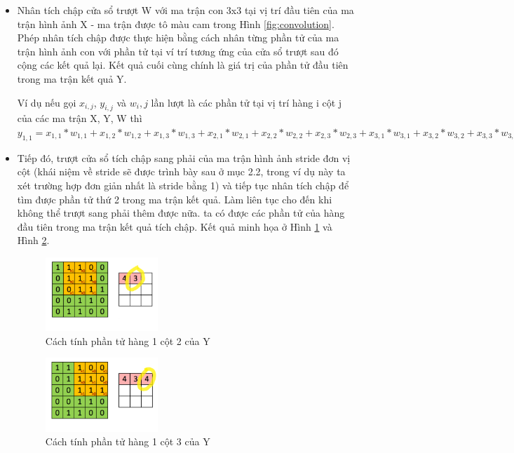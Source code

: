 \documentclass[a4paper]{article}
\begin{document}
\begin{itemize}
    \item Nhân tích chập cửa sổ trượt W với ma trận con 3x3 tại vị trí đầu tiên của ma
trận hình ảnh X - ma trận được tô màu cam trong Hình \ref{fig:convolution}. Phép nhân tích chập được thực hiện bằng cách nhân từng phần
tử của ma trận hình ảnh con với phần tử tại ví trí tương ứng của cửa sổ trượt
sau đó cộng các kết quả lại. Kết quả cuối cùng chính là giá trị của phần tử
đầu tiên trong ma trận kết quả Y. 

Ví dụ nếu gọi $x_{i,j}$, $y_{i,j}$ và $w_i,j$ lần lượt là các phần tử tại vị trí hàng i cột j của các ma trận X, Y, W thì $y_{1,1} = x_{1,1}*w_{1,1}+x_{1,2}*w_{1,2}+x_{1,3}*w_{1,3}+x_{2,1}*w_{2,1}+x_{2,2}*w_{2,2}+x_{2,3}*w_{2,3}+x_{3,1}*w_{3,1}+x_{3,2}*w_{3,2}+x_{3,3}*w_{3,3} = 1 * 1 + 1 * 0 + 1 * 1 + 0 * 0 + 1 * 1 + 1 * 0 + 0 * 1 + 0 * 0 + 1 * 1 = 4$

\item Tiếp đó, trượt cửa sổ tích chập sang phải của ma trận hình ảnh stride đơn vị cột (khái niệm về stride sẽ được trình bày sau ở mục 2.2, trong ví dụ này ta xét trường hợp đơn giản nhất là stride bằng 1) và tiếp tục nhân tích chập để tìm được phần tử thứ 2 trong ma trận kết quả. Làm liên tục cho đến khi không thể trượt sang phải thêm được nữa. ta có được các phần tử của hàng đầu tiên trong ma trận kết quả tích chập. Kết quả minh họa ở Hình \ref{fig:FR1} và Hình \ref{fig:FR2}.

\begin{figure}[!h]
    \centering
    \includegraphics[width=0.4\textwidth]{image/first_row_1.png}
    \caption{Cách tính phần tử hàng 1 cột 2 của Y}
    \label{fig:FR1}
\end{figure}

\begin{figure}[!h]
    \centering
    \includegraphics[width=0.4\textwidth]{image/first_row_2.png}
    \caption{Cách tính phần tử hàng 1 cột 3 của Y}
    \label{fig:FR2}
\end{figure}


\end{itemize}
\end{document}
